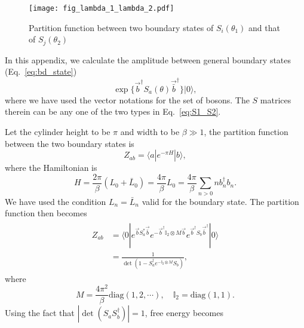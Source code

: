 
\begin{figure}[h]
\centering
\texttt{[image: fig\_lambda\_1\_lambda\_2.pdf]}
\caption{Partition function between two boundary states of $S_i( \theta_1)$ and that of $S_j( \theta_2 )$}
\label{fig:fig_lambda_1_lambda_2}
\end{figure}

In this appendix, we calculate the amplitude between general boundary states (\cf  Eq.~\eqref{eq:bd_state})
\begin{equation}
\exp\Big\{  \vec{b}^{\dagger} S_a( \theta )   \vec{\bar{b}}^{\dagger}\Big\}  |0  \rangle ,
\end{equation}
where we have used the vector notations for the set of bosons. The $S$ matrices therein can be any one of the two types in Eq.~\eqref{eq:S1_S2}. 

Let the cylinder height to be $\pi$ and width to be $\beta \gg 1 $, the partition function between the two boundary states is
\begin{equation}
Z_{ab} =  \langle a | e^{ - \pi H } |b \rangle ,
\end{equation}
where the Hamiltonian is
\begin{equation}
H = \frac{2\pi}{\beta} (L_0 + \bar{L}_0) =  \frac{4\pi}{\beta}  L_0 = \frac{4\pi}{\beta}\sum_{n > 0 }  n b_n^{\dagger} b_n. 
\end{equation}
We have used the condition $L_n = \bar{L}_n$ valid for the boundary state. The partition function then becomes
\begin{eqnarray}\begin{aligned}
Z_{ab} &= \langle 0 | e^{ \vec{b} S_a^* \vec{\bar{b}} } e^{ - \vec{b}^{\dagger} \mathbb{I}_2 \otimes M  \vec{b} } e^{  \vec{b}^{\dagger} S_b  \vec{\bar{b}}^{\dagger} }  |0  \rangle  \\
&= \frac{1}{\det ( 1 - S^{\dagger} _a  e^{- \mathbb{I}_2 \otimes M} S_b) } ,
\end{aligned}\end{eqnarray}
where
\begin{equation}
M =  \frac{4\pi^2}{\beta} \text{diag}( 1, 2, \cdots ), \quad  \mathbb{I}_2 = \text{diag}( 1, 1) .
\end{equation}
Using the fact that $|\det( S_a S_b^{\dagger})|  = 1$, free energy becomes
